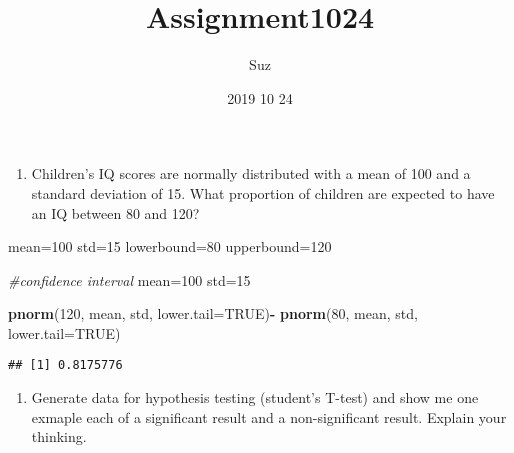 \documentclass[]{article}
\title{Assignment1024}
\author{Suz}
\date{2019 10 24}
\newenvironment{Shaded}{\begin{snugshade}}{\end{snugshade}}
\newcommand{\CommentTok}[1]{\textcolor[rgb]{0.56,0.35,0.01}{\textit{#1}}}
\newcommand{\DataTypeTok}[1]{\textcolor[rgb]{0.13,0.29,0.53}{#1}}
\newcommand{\DecValTok}[1]{\textcolor[rgb]{0.00,0.00,0.81}{#1}}
\newcommand{\KeywordTok}[1]{\textcolor[rgb]{0.13,0.29,0.53}{\textbf{#1}}}
\newcommand{\NormalTok}[1]{#1}
\newcommand{\OperatorTok}[1]{\textcolor[rgb]{0.81,0.36,0.00}{\textbf{#1}}}
\newcommand{\OtherTok}[1]{\textcolor[rgb]{0.56,0.35,0.01}{#1}}
\newcommand{\StringTok}[1]{\textcolor[rgb]{0.31,0.60,0.02}{#1}}
\providecommand{\tightlist}{%
  \setlength{\itemsep}{0pt}\setlength{\parskip}{0pt}}
\begin{document}
\maketitle

\begin{enumerate}
\def\labelenumi{\arabic{enumi})}
\tightlist
\item
  Children's IQ scores are normally distributed with a mean of 100 and a
  standard deviation of 15. What proportion of children are expected to
  have an IQ between 80 and 120?
\end{enumerate}

mean=100 std=15 lowerbound=80 upperbound=120

\begin{Shaded}
\begin{Highlighting}[]
\CommentTok{#confidence interval}
\NormalTok{mean=}\DecValTok{100}
\NormalTok{std=}\DecValTok{15}

\KeywordTok{pnorm}\NormalTok{(}\DecValTok{120}\NormalTok{, mean, std, }\DataTypeTok{lower.tail=}\OtherTok{TRUE}\NormalTok{)}\OperatorTok{-}\StringTok{ }\KeywordTok{pnorm}\NormalTok{(}\DecValTok{80}\NormalTok{, mean, std, }\DataTypeTok{lower.tail=}\OtherTok{TRUE}\NormalTok{)}
\end{Highlighting}
\end{Shaded}

\begin{verbatim}
## [1] 0.8175776
\end{verbatim}

\begin{enumerate}
\def\labelenumi{\arabic{enumi})}
\setcounter{enumi}{1}
\tightlist
\item
  Generate data for hypothesis testing (student's T-test) and show me
  one exmaple each of a significant result and a non-significant result.
  Explain your thinking.
\end{enumerate}
\end{document}
